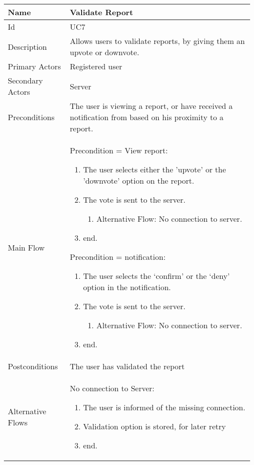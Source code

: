 \begin{tabularx}{\textwidth}{|l|X|}
\hline
Name              & Validate Report \\ \hline 
Id                & UC7 \\ \hline
Description       & Allows users to validate reports, by giving them an upvote or downvote. \\ \hline
Primary Actors    & Registered user \\ \hline
Secondary Actors  & Server \\ \hline
Preconditions     & The user is viewing a report, or have received a notification from based on his proximity to a report. \\ \hline
Main Flow         &
Precondition = View report:
{\footnotesize \begin{enumerate}
\item The user selects either the 'upvote' or the 'downvote' option on the report.
\item The vote is sent to the server.
 \begin{enumerate}
\item Alternative Flow: No connection to server.
\end{enumerate}
\item end.
\end{enumerate}}
Precondition = notification:
{\footnotesize \begin{enumerate}
\item The user selects the ‘confirm’ or the ‘deny’ option in the notification.
\item The vote is sent to the server.
 \begin{enumerate}
\item Alternative Flow: No connection to server.
\end{enumerate}
\item end.
\end{enumerate}} 
\\ \hline
Postconditions    & The user has validated the report \\ \hline
Alternative Flows & 
No connection to Server:
{\footnotesize \begin{enumerate}
\item The user is informed of the missing connection.
\item Validation option is stored, for later retry
\item end.
\end{enumerate}}
\\ \hline
\end{tabularx}

